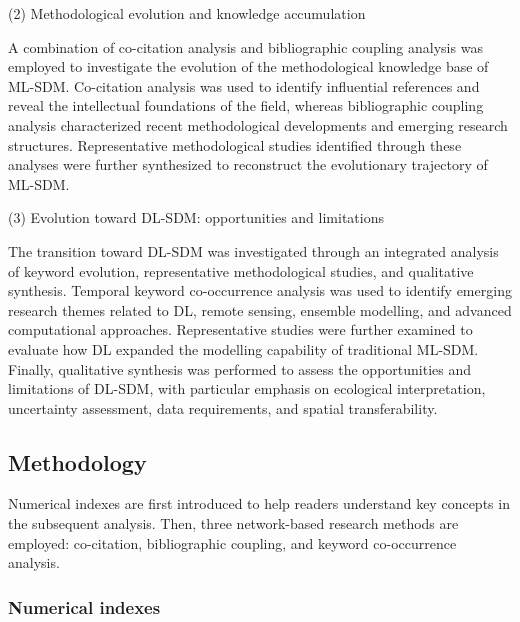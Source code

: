 \documentclass[authoryear,preprint,review,12pt]{elsarticle}
\begin{document}
(2) Methodological evolution and knowledge accumulation

A combination of co-citation analysis and bibliographic coupling analysis was employed to investigate the evolution of the methodological knowledge base of ML-SDM. Co-citation analysis was used to identify influential references and reveal the intellectual foundations of the field, whereas bibliographic coupling analysis characterized recent methodological developments and emerging research structures. Representative methodological studies identified through these analyses were further synthesized to reconstruct the evolutionary trajectory of ML-SDM.

(3) Evolution toward DL-SDM: opportunities and limitations

The transition toward DL-SDM was investigated through an integrated analysis of keyword evolution, representative methodological studies, and qualitative synthesis. Temporal keyword co-occurrence analysis was used to identify emerging research themes related to DL, remote sensing, ensemble modelling, and advanced computational approaches. Representative studies were further examined to evaluate how DL expanded the modelling capability of traditional ML-SDM. Finally, qualitative synthesis was performed to assess the opportunities and limitations of DL-SDM, with particular emphasis on ecological interpretation, uncertainty assessment, data requirements, and spatial transferability.



\subsection{Methodology}

Numerical indexes are first introduced to help readers understand key concepts in the subsequent analysis. Then, three network-based research methods are employed: co-citation, bibliographic coupling, and keyword co-occurrence analysis.

\subsubsection{Numerical indexes}
\end{document}
